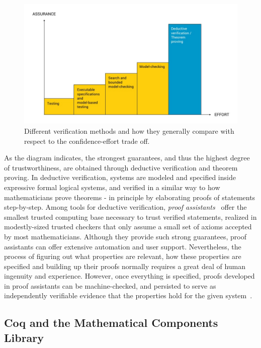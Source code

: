 \begin{figure}
  \includegraphics[width=\linewidth]{assets/verification.png}
  \caption{Different verification methods and how they generally compare with respect to the confidence-effort trade off.}
  \label{fig:verification}
\end{figure}

As the diagram indicates, the strongest guarantees, and thus the highest degree of trustworthiness, are obtained through deductive verification and theorem proving. In deductive verification, systems are modeled and specified inside expressive formal logical systems, and verified in a similar way to how mathematicians prove theorems - in principle by elaborating proofs of statements step-by-step. Among tools for deductive verification, \emph{proof assistants}~\cite{Geuvers2009,Harrison2014} offer the smallest trusted computing base necessary to trust verified statements, realized in modestly-sized trusted checkers that only assume a small set of axioms accepted by most mathematicians. Although they provide such strong guarantees, proof assistants can offer extensive automation and user support. Nevertheless, the process of figuring out what properties are relevant, how these properties are specified and building up their proofs normally requires a great deal of human ingenuity and experience. However, once everything is specified, proofs developed in proof assistants can be machine-checked, and persisted to serve as independently verifiable evidence that the properties hold for the given system~\cite{Pollack1998}.

\subsection{Coq and the Mathematical Components Library}

